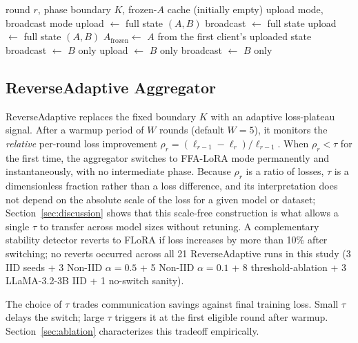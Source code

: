 \begin{algorithm}[t]
\caption{Bidirectional B-only protocol (server, per round)}
\label{alg:bonly}
\begin{algorithmic}[1]
\Require round $r$, phase boundary $K$, frozen-$A$ cache (initially empty)
\Ensure upload mode, broadcast mode
 
    \State upload $\leftarrow$ full state $(A, B)$
    \State broadcast $\leftarrow$ full state
 
    \State upload $\leftarrow$ full state $(A, B)$
    \State $A_{\text{frozen}} \leftarrow$ $A$ from the first client's uploaded state
    \State broadcast $\leftarrow$ $B$ only 
\Else {}
    \State upload $\leftarrow$ $B$ only 
    \State broadcast $\leftarrow$ $B$ only 
\EndIf
\end{algorithmic}
\end{algorithm}

\subsection{ReverseAdaptive Aggregator}
ReverseAdaptive replaces the fixed boundary $K$ with an adaptive loss-plateau signal. After a warmup period of $W$ rounds (default $W{=}5$), it monitors the \emph{relative} per-round loss improvement $\rho_r = (\ell_{r-1} - \ell_r) / \ell_{r-1}$. When $\rho_r < \tau$ for the first time, the aggregator switches to FFA-LoRA \citep{sun2024ffalora} mode permanently and instantaneously, with no intermediate phase. Because $\rho_r$ is a ratio of losses, $\tau$ is a dimensionless fraction rather than a loss difference, and its interpretation does not depend on the absolute scale of the loss for a given model or dataset; Section~\ref{sec:discussion} shows that this scale-free construction is what allows a single $\tau$ to transfer across model sizes without retuning. A complementary stability detector reverts to FLoRA if loss increases by more than 10\% after switching; no reverts occurred across all 21 ReverseAdaptive runs in this study (3 IID seeds + 3 Non-IID $\alpha{=}0.5$ + 5 Non-IID $\alpha{=}0.1$ + 8 threshold-ablation + 3 LLaMA-3.2-3B IID + 1 no-switch sanity).

The choice of $\tau$ trades communication savings against final training loss. Small $\tau$ delays the switch; large $\tau$ triggers it at the first eligible round after warmup. Section~\ref{sec:ablation} characterizes this tradeoff empirically.

